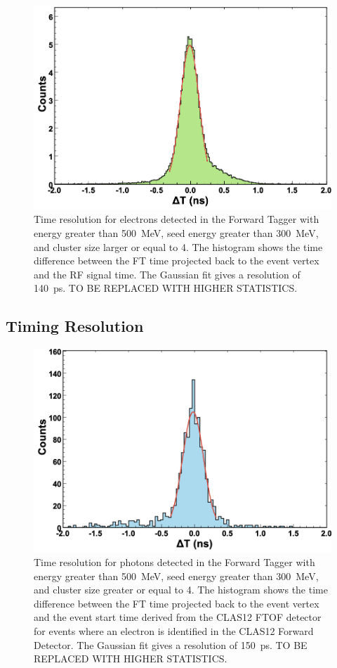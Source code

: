 \begin{figure}[h]
\includegraphics[height=0.6\columnwidth]{fig/ft_electron_time.png}
\caption{Time resolution for electrons detected in the Forward Tagger with energy greater than 500~MeV, seed
  energy greater than 300~MeV, and cluster size larger or equal to 4. The histogram shows the time difference
  between the FT time projected back to the event vertex and the RF signal time. The Gaussian fit gives a resolution
  of 140~ps. TO BE REPLACED WITH HIGHER STATISTICS.}
\label{fig:electron_time}
\end{figure}

\subsection{Timing Resolution}

\begin{figure}[h]
\includegraphics[height=0.6\columnwidth]{fig/ft_gamma_time.png}
\caption{Time resolution for photons detected in the Forward Tagger with energy greater than 500~MeV, seed
  energy greater than 300~MeV, and cluster size greater or equal to 4. The histogram shows the time difference
  between the FT time projected back to the event vertex and the event start time derived from the CLAS12 FTOF
  detector for events where an electron is identified in the CLAS12 Forward Detector. The Gaussian fit gives a
  resolution of 150~ps. TO BE REPLACED WITH HIGHER STATISTICS.}
\label{fig:gamma_time}
\end{figure}

